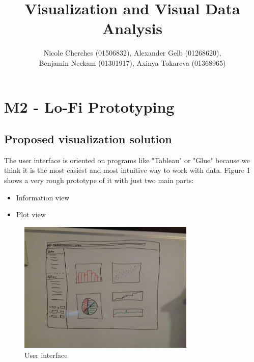\documentclass{article}
\begin{document}
\title{Visualization and Visual Data Analysis}
\author{Nicole Cherches (01506832), Alexander Gelb (01268620), \\Benjamin Neckam (01301917), Axinya Tokareva (01368965)}
\maketitle
\section{M2 - Lo-Fi Prototyping}
\subsection{Proposed visualization solution}
The user interface is oriented on programs like "Tableau" or "Glue" because we think it is the most easiest and most intuitive way to work with data. Figure 1 shows a very rough prototype of it with just two main parts:\\
\begin{itemize}
\item Information view
\item Plot view
\end{itemize}

\begin{figure}[!h]
\centering
    \includegraphics[width=0.75\textwidth]{images/Prototype1.jpg}
	\caption{User interface}
	\label{fig1}
\end{figure}
\end{document}
